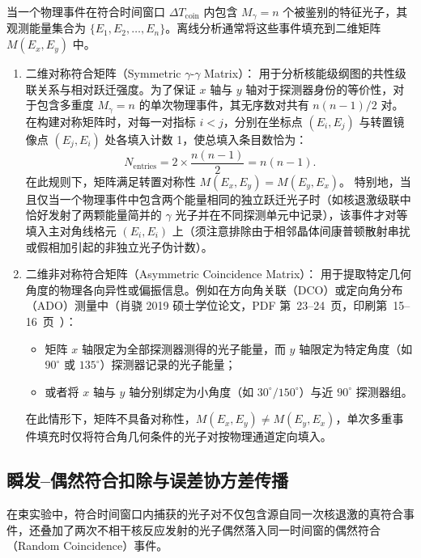 当一个物理事件在符合时间窗口 $\Delta T_{\mathrm{coin}}$ 内包含 $M_\gamma = n$ 个被鉴别的特征光子，其观测能量集合为 $\{E_1, E_2, \dots, E_n\}$。离线分析通常将这些事件填充到二维矩阵 $M(E_x, E_y)$ 中。
\begin{enumerate}
\item 二维对称符合矩阵（Symmetric $\gamma\text{-}\gamma$ Matrix）：
用于分析核能级纲图的共性级联关系与相对跃迁强度。为了保证 $x$ 轴与 $y$ 轴对于探测器身份的等价性，对于包含多重度 $M_\gamma = n$ 的单次物理事件，其无序数对共有 $n(n - 1)/2$ 对。在构建对称矩阵时，对每一对指标 $i < j$，分别在坐标点 $(E_i, E_j)$ 与转置镜像点 $(E_j, E_i)$ 处各填入计数 1，使总填入条目数恰为：
\begin{equation}\label{eq:5-6-ordered-pairs}
N_{\mathrm{entries}} = 2 \times \frac{n(n - 1)}{2} = n (n - 1).
\end{equation}
在此规则下，矩阵满足转置对称性 $M(E_x, E_y) = M(E_y, E_x)$。
特别地，当且仅当一个物理事件中包含两个能量相同的独立跃迁光子时（如核退激级联中恰好发射了两颗能量简并的 $\gamma$ 光子并在不同探测单元中记录），该事件才对等填入主对角线格元 $(E_i, E_i)$ 上（须注意排除由于相邻晶体间康普顿散射串扰或假相加引起的非独立光子伪计数）。
\item 二维非对称符合矩阵（Asymmetric Coincidence Matrix）：
用于提取特定几何角度的物理各向异性或偏振信息。例如在方向角关联（DCO）或定向角分布（ADO）测量中（肖骁 2019 硕士学位论文，PDF 第~23--24~页，印刷第~15--16~页~\cite{xiao-xiao-2019-high-spin-74as-thesis}）：
\begin{itemize}
\item 矩阵 $x$ 轴限定为全部探测器测得的光子能量，而 $y$ 轴限定为特定角度（如 $90^\circ$ 或 $135^\circ$）探测器记录的光子能量；
\item 或者将 $x$ 轴与 $y$ 轴分别绑定为小角度（如 $30^\circ/150^\circ$）与近 $90^\circ$ 探测器组。
\end{itemize}
在此情形下，矩阵不具备对称性，$M(E_x, E_y) \neq M(E_y, E_x)$，单次多重事件填充时仅将符合角几何条件的光子对按物理通道定向填入。
\end{enumerate}

\subsection{瞬发--偶然符合扣除与误差协方差传播}\label{subsec:5-6-3}

在束实验中，符合时间窗口内捕获的光子对不仅包含源自同一次核退激的真符合事件，还叠加了两次不相干核反应发射的光子偶然落入同一时间窗的偶然符合（Random Coincidence）事件。

